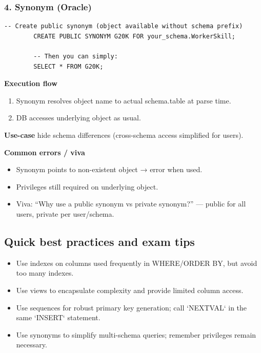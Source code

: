 \documentclass[11pt,a4paper]{article}
\begin{document}
	\bigskip
	\subsubsection*{4. Synonym (Oracle)}
	\begin{lstlisting}[caption={Create and use a synonym}]
		-- Create public synonym (object available without schema prefix)
		CREATE PUBLIC SYNONYM G20K FOR your_schema.WorkerSkill;
		
		-- Then you can simply:
		SELECT * FROM G20K;
	\end{lstlisting}
	
	\textbf{Execution flow}
	\begin{enumerate}[noitemsep]
		\item Synonym resolves object name to actual schema.table at parse time.  
		\item DB accesses underlying object as usual.
	\end{enumerate}
	
	\textbf{Use-case} hide schema differences (cross-schema access simplified for users).
	
	\textbf{Common errors / viva}
	\begin{itemize}[noitemsep]
		\item Synonym points to non-existent object → error when used.  
		\item Privileges still required on underlying object.  
		\item Viva: ``Why use a public synonym vs private synonym?'' — public for all users, private per user/schema.
	\end{itemize}
	
	\subsection{Quick best practices and exam tips}
	\begin{itemize}[noitemsep]
		\item Use indexes on columns used frequently in WHERE/ORDER BY, but avoid too many indexes.  
		\item Use views to encapsulate complexity and provide limited column access.  
		\item Use sequences for robust primary key generation; call `NEXTVAL` in the same `INSERT` statement.  
		\item Use synonyms to simplify multi-schema queries; remember privileges remain necessary.
	\end{itemize}
	
\end{document}
